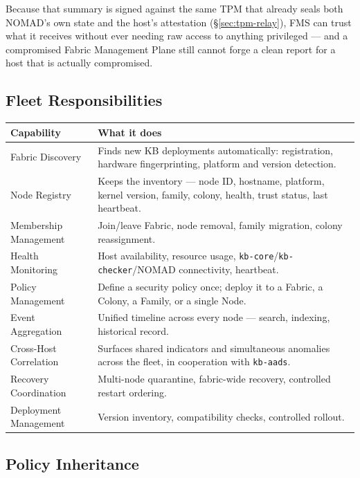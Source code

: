 \documentclass[11pt,a4paper]{article}
\begin{document}
Because that summary is signed against the same TPM that already seals
both NOMAD's own state and the host's attestation (\S\ref{sec:tpm-relay}),
FMS can trust what it receives without ever needing raw access to
anything privileged --- and a compromised Fabric Management Plane still
cannot forge a clean report for a host that is actually compromised.

\subsection{Fleet Responsibilities}

\begin{center}
\renewcommand{\arraystretch}{1.3}
\begin{tabular}{@{}p{4.0cm}p{9.6cm}@{}}
\toprule
\textbf{Capability} & \textbf{What it does} \\
\midrule
Fabric Discovery & Finds new KB deployments automatically: registration, hardware fingerprinting, platform and version detection. \\
Node Registry & Keeps the inventory --- node ID, hostname, platform, kernel version, family, colony, health, trust status, last heartbeat. \\
Membership Management & Join/leave Fabric, node removal, family migration, colony reassignment. \\
Health Monitoring & Host availability, resource usage, \texttt{kb-core}/\texttt{kb-checker}/NOMAD connectivity, heartbeat. \\
Policy Management & Define a security policy once; deploy it to a Fabric, a Colony, a Family, or a single Node. \\
Event Aggregation & Unified timeline across every node --- search, indexing, historical record. \\
Cross-Host Correlation & Surfaces shared indicators and simultaneous anomalies across the fleet, in cooperation with \texttt{kb-aads}. \\
Recovery Coordination & Multi-node quarantine, fabric-wide recovery, controlled restart ordering. \\
Deployment Management & Version inventory, compatibility checks, controlled rollout. \\
\bottomrule
\end{tabular}
\end{center}

\subsection{Policy Inheritance}
\end{document}
